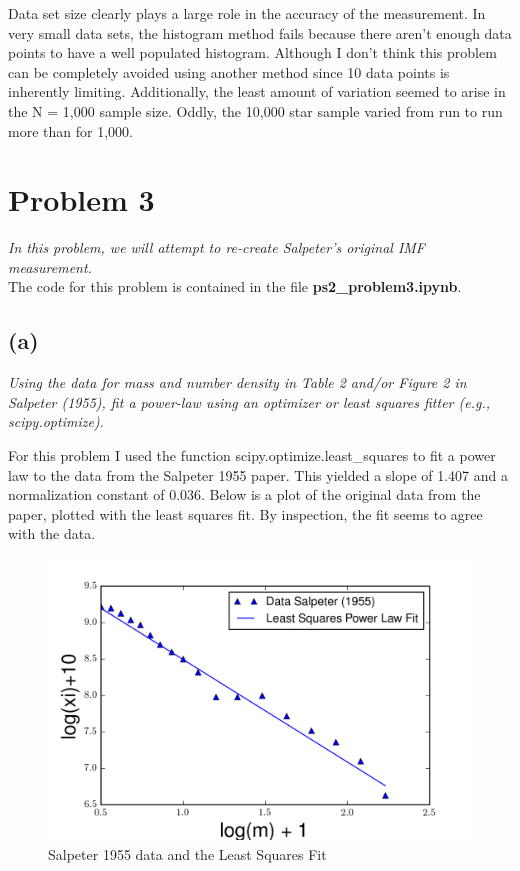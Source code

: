 \documentclass[english,11pt]{article}
\begin{document}
Data set size clearly plays a large role in the accuracy of the measurement. In very small data sets, the histogram method fails because there aren't enough data points to have a well populated histogram. Although I don't think this problem can be completely avoided using another method since 10 data points is inherently limiting. Additionally, the least amount of variation seemed to arise in the N = 1,000 sample size. Oddly, the 10,000 star sample varied from run to run more than for 1,000.

\section*{Problem 3}
\textit{In this problem, we will attempt to re-create Salpeter's original IMF measurement.}\\
The code for this problem is contained in the file \textbf{ps2\_problem3.ipynb}.

\subsection*{(a)}
\textit{Using the data for mass and number density in Table 2 and/or Figure 2 in Salpeter (1955), fit a power-law using an optimizer or least squares fitter (e.g., scipy.optimize).}

For this problem I used the function scipy.optimize.least\_squares to fit a power law to the data from the Salpeter 1955 paper. This yielded a slope of 1.407 and a normalization constant of 0.036. Below is a plot of the original data from the paper, plotted with the least squares fit. By inspection, the fit seems to agree with the data.

\begin{figure}[H]
\centering
\caption{Salpeter 1955 data and the Least Squares Fit}
\includegraphics[scale = 0.6]{least_squares_fit_prob_3.png}
\end{figure}
\end{document}
